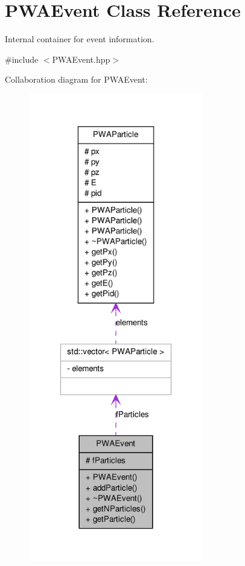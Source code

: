 \hypertarget{classPWAEvent}{
\section{PWAEvent Class Reference}
\label{dc/d66/classPWAEvent}
}


Internal container for event information.  




{\ttfamily \#include $<$PWAEvent.hpp$>$}



Collaboration diagram for PWAEvent:
\nopagebreak
\begin{figure}[H]
\begin{center}
\leavevmode
\includegraphics[width=216pt]{de/def/classPWAEvent__coll__graph}
\end{center}
\end{figure}
